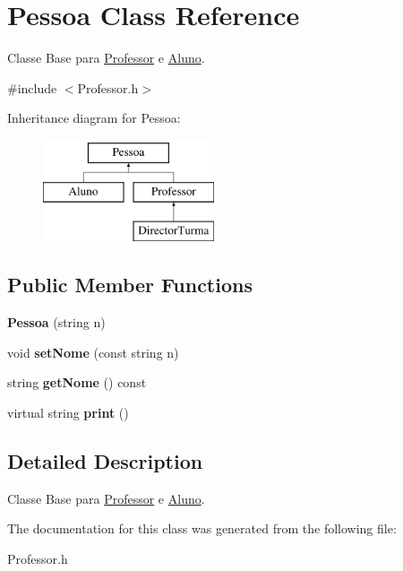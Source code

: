 \hypertarget{class_pessoa}{\section{Pessoa Class Reference}
\label{class_pessoa}
}


Classe Base para \hyperlink{class_professor}{Professor} e \hyperlink{class_aluno}{Aluno}.  




{\ttfamily \#include $<$Professor.\-h$>$}

Inheritance diagram for Pessoa\-:\begin{figure}[H]
\begin{center}
\leavevmode
\includegraphics[height=3.000000cm]{class_pessoa}
\end{center}
\end{figure}
\subsection*{Public Member Functions}
\begin{DoxyCompactItemize}
\item 
\hypertarget{class_pessoa_a789675384a5b47a16c9f0a5a819aa1ff}{{\bfseries Pessoa} (string n)}\label{class_pessoa_a789675384a5b47a16c9f0a5a819aa1ff}

\item 
\hypertarget{class_pessoa_afe5128d96f8ef52b644746b9a45f63e7}{void {\bfseries set\-Nome} (const string n)}\label{class_pessoa_afe5128d96f8ef52b644746b9a45f63e7}

\item 
\hypertarget{class_pessoa_a8d4d2f40ba5634f49b0ce181fee7f0a7}{string {\bfseries get\-Nome} () const }\label{class_pessoa_a8d4d2f40ba5634f49b0ce181fee7f0a7}

\item 
\hypertarget{class_pessoa_a6ccbd5e11c47beb6de6650054caa5a79}{virtual string {\bfseries print} ()}\label{class_pessoa_a6ccbd5e11c47beb6de6650054caa5a79}

\end{DoxyCompactItemize}


\subsection{Detailed Description}
Classe Base para \hyperlink{class_professor}{Professor} e \hyperlink{class_aluno}{Aluno}. 

The documentation for this class was generated from the following file\-:\begin{DoxyCompactItemize}
\item 
Professor.\-h\end{DoxyCompactItemize}
